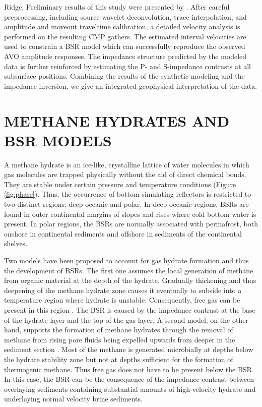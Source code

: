 Ridge. Preliminary results of this study were presented by \cite{Ecker.sep.79.161,Ecker.agu.93.370}. 
After careful preprocessing, including
source wavelet deconvolution, trace interpolation, and amplitude
and moveout traveltime calibration, a detailed velocity analysis is performed
on the resulting CMP gathers. The estimated interval velocities are used to
constrain a BSR model which can successfully reproduce the observed AVO
amplitude responses. The impedance structure predicted by the modeled data is
further reinforced by estimating the P- and S-impedance contrasts at all 
subsurface positions. Combining the results of the synthetic modeling and
the impedance inversion, we give an integrated geophysical interpretation of 
the data.

\section{METHANE HYDRATES AND BSR MODELS}

A methane hydrate is an ice-like, crystalline lattice of water molecules in
which gas molecules are trapped physically without the aid of direct
chemical bonds. They are stable under certain pressure and temperature 
conditions (Figure \ref{fig:phase}). Thus, the occurrence of bottom simulating 
reflectors is restricted to two distinct regions: deep oceanic and polar.
In deep oceanic regions, BSRs are found in 
outer continental margins of slopes and rises where cold bottom water is
present. In polar regions, the BSRs are normally associated with permafrost,
both onshore in continental sediments and offshore in sediments of the
continental shelves.


\par
Two models have been proposed to account for gas hydrate formation and thus
the development of BSRs. The first one assumes the local generation of methane
from organic material at the depth of the hydrate. Gradually thickening and 
thus deepening of the methane hydrate zone causes it eventually to subside
into a temperature region where hydrate is unstable. Consequently, free gas
can be present in this region \cite[]{Kvenvolden.aapetgeo.34}. The BSR is caused
by the impedance contrast at the base of the hydrate layer and the top of the 
gas layer. A second model, on the other hand, supports the formation of methane
hydrates through the removal of methane from rising pore fluids being expelled
upwards from deeper in the sediment section \cite[]{Hyndman.jgr.97}. Most of
the methane is generated microbially at depths below the hydrate stability
zone but not at depths sufficient for the formation of thermogenic methane.
Thus free gas does not have to be present below the BSR. In this case, the
BSR can be the consequence of the impedance contrast between overlaying 
sediments containing substantial amounts of high-velocity hydrate and 
underlaying normal velocity brine sediments. 

